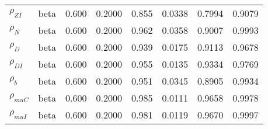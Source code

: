 \begin{center}
\begin{longtable}{llcccccc}
${\rho_{ZI}}$ & beta &   0.600 & 0.2000 &   0.855& 0.0338 &  0.7994 &  0.9079 \\ 
${\rho_N}$ & beta &   0.600 & 0.2000 &   0.962& 0.0358 &  0.9007 &  0.9993 \\ 
${\rho_D}$ & beta &   0.600 & 0.2000 &   0.939& 0.0175 &  0.9113 &  0.9678 \\ 
${\rho_{DI}}$ & beta &   0.600 & 0.2000 &   0.955& 0.0135 &  0.9334 &  0.9769 \\ 
${\rho_b}$ & beta &   0.600 & 0.2000 &   0.951& 0.0345 &  0.8905 &  0.9934 \\ 
${\rho_{muC}}$ & beta &   0.600 & 0.2000 &   0.985& 0.0111 &  0.9658 &  0.9978 \\ 
${\rho_{muI}}$ & beta &   0.600 & 0.2000 &   0.981& 0.0119 &  0.9670 &  0.9997 \\ 
\end{longtable}
 \end{center}
